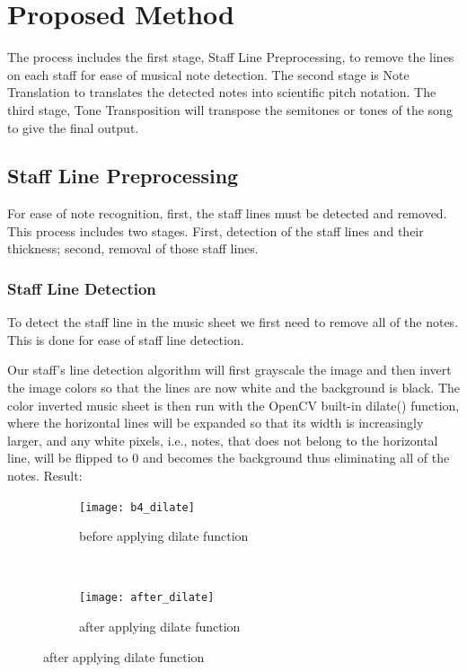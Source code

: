 \documentclass[final]{cvpr}
\begin{document}
\section{Proposed Method}
The process includes the first stage, Staff Line Preprocessing, to remove the
lines on each staff for ease of musical note detection. The second stage is Note
Translation to translates the detected notes into scientific pitch notation. The
third stage, Tone Transposition will transpose the semitones or tones of the
song to give the final output. 

\subsection{Staff Line Preprocessing}
For ease of note recognition, first, the staff lines must be detected and
removed. This process includes two stages. First, detection of the staff lines
and their thickness; second, removal of those staff lines.

\subsubsection{Staff Line Detection}
To detect the staff line in the music sheet we first need to remove all of the notes.
This is done for ease of staff line detection.

Our staff's line detection algorithm will first grayscale the image and then
invert the image colors so that the lines are now white and the background is
black. The color inverted music sheet is then run with the OpenCV built-in
dilate() function, where the horizontal lines will be expanded so that its width
is increasingly larger, and any white pixels, i.e., notes, that does not belong
to the horizontal line, will be flipped to 0 and becomes the background thus
eliminating all of the notes.
\clearpage
Result:
\begin{figure}[H]
    \centering
    \begin{subfigure}[t]{0.2\textwidth}
        \centering
        \texttt{[image: b4\_dilate]}
        \caption{before applying dilate function}
    \end{subfigure}%
    ~ 
    \begin{subfigure}[t]{0.2\textwidth}
        \centering
        \texttt{[image: after\_dilate]}
        \caption{after applying dilate function}
    \end{subfigure}
\end{figure}
\end{document}
